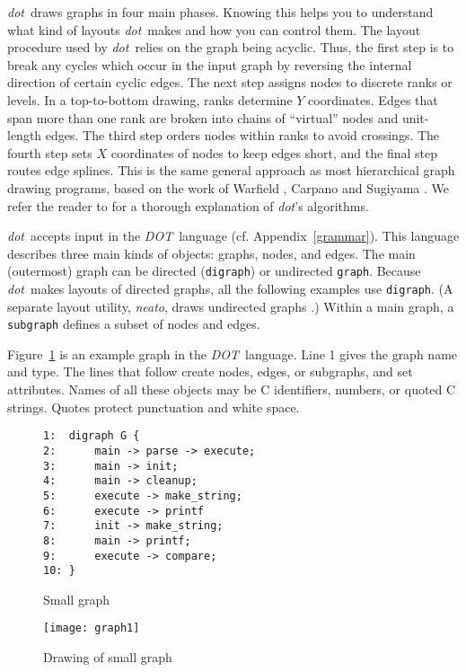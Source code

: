\documentclass[11pt]{article}
\def\dot{{\it dot}}
\def\DOT{{\it DOT}}
\begin{document}
\dot\ draws graphs in four main phases.
Knowing this helps you to understand what kind of
layouts \dot\ makes and how you can control them.
The layout procedure used by \dot\ relies on the graph
being acyclic. Thus, the first step is to break any
cycles which occur in the input graph by reversing
the internal direction of certain cyclic edges.
The next step assigns nodes to discrete ranks or levels.
In a top-to-bottom drawing, ranks determine $Y$ coordinates.
Edges that span more than one rank are broken into chains
of ``virtual'' nodes and unit-length edges.
The third step orders nodes within ranks to avoid crossings.
The fourth step sets $X$ coordinates of nodes to keep edges short,
and the final step routes edge splines.
This is the same general approach as most hierarchical graph drawing
programs, based on the work of Warfield \cite{warfield},
Carpano \cite{carpano} and Sugiyama \cite{stt}.
We refer the reader to \cite{gknv:methods}
for a thorough explanation of \dot's algorithms.

\dot\ accepts input in the \DOT\ language (cf. Appendix~\ref{grammar}). 
This language describes three main kinds of objects:
graphs, nodes, and edges.
The main (outermost) graph can be directed
({\tt digraph}) or undirected {\tt graph}.
Because \dot\ makes layouts of directed graphs,
all the following examples use {\tt digraph}.
(A separate layout utility, {\it neato},
draws undirected graphs \cite{neatoguide}.)
Within a main graph, a {\tt subgraph} defines a
subset of nodes and edges.

Figure~\ref{fig:graph1} is an example graph in the \DOT\ language. 
Line 1 gives the graph name and type.
The lines that follow create nodes, edges, or subgraphs,
and set attributes. Names of all these objects may be
C identifiers, numbers, or quoted C strings.
Quotes protect punctuation and white space.

\begin{figure}[p]
\begin{verbatim}
1:  digraph G {
2:      main -> parse -> execute;
3:      main -> init;
4:      main -> cleanup;
5:      execute -> make_string;
6:      execute -> printf
7:      init -> make_string;
8:      main -> printf;
9:      execute -> compare;
10: }
\end{verbatim}
\caption{Small graph}
\label{fig:graph1}
\end{figure}

\begin{figure}[p]
	\centerline {
		\texttt{[image: graph1]}
	}
    \caption{Drawing of small graph}
    \label{fig:drawing1}
\end{figure}
\end{document}
